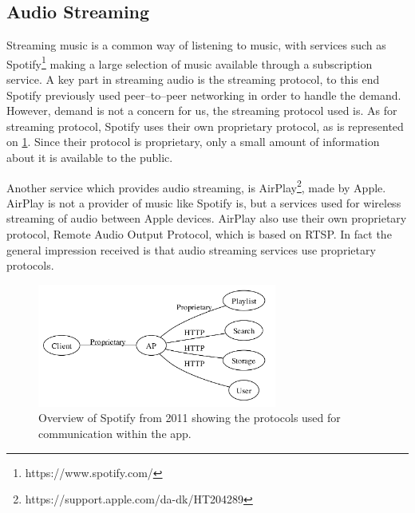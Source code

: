 \subsection{Audio Streaming}
Streaming music is a common way of listening to music, with services such as Spotify\footnote{https://www.spotify.com/} making a large selection of music available through a subscription service.
A key part in streaming audio is the streaming protocol, to this end Spotify previously used peer--to--peer networking in order to handle the demand.\cite{spotify1}
However, demand is not a concern for us, the streaming protocol used is.
As for streaming protocol, Spotify uses their own proprietary protocol, as is represented on \cref{fig:spotifyOverview}.\cite{spotifySlides} %
Since their protocol is proprietary, only a small amount of information about it is available to the public.

Another service which provides audio streaming, is AirPlay\footnote{https://support.apple.com/da-dk/HT204289}, made by Apple.
AirPlay is not a provider of music like Spotify is, but a services used for wireless streaming of audio between Apple devices.
AirPlay also use their own proprietary protocol, Remote Audio Output Protocol, which is based on \ac{RTSP}.
In fact the general impression received is that audio streaming services use proprietary protocols.

\begin{figure}[!bht]
    \centering
    \includegraphics[width=0.7\textwidth]{img/spotifyOverview.png}
    \caption{Overview of Spotify from 2011 showing the protocols used for communication within the app.\cite{spotifySlides}}
    \label{fig:spotifyOverview}
\end{figure}


